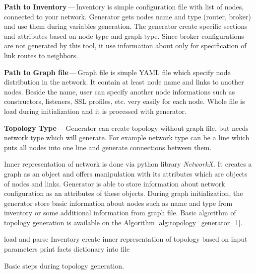 \begin{description}
	\item \textbf{Path to Inventory}\,---\,Inventory is simple configuration file with list of nodes, connected to your network. Generator gets nodes name and type (router, broker) and use them during variables generation. The generator create specific sections and attributes based on node type and graph type. Since broker configurations are not generated by this tool, it use information about only for specification of link routes to neighbors.
	\item \textbf{Path to Graph file}\,---\,Graph file is simple YAML file which specify node distribution in the network. It contain at least node name and links to another nodes. Beside the name, user can specify another node informations such as constructors, listeners, SSL profiles, etc. very easily for each node. Whole file is load during initialization and it is processed with generator.
	\item \textbf{Topology Type}\,---\,Generator can create topology without graph file, but needs network type which will generate. For example network type can be a line which puts all nodes into one line and generate connections between them.
\end{description}

Inner representation of network is done via python library \emph{NetworkX}\footnotemark. It creates a graph as an object and offers manipulation with its attributes which are objects of nodes and links. Generator is able to store information about network configuration as an attributes of these objects. During graph initialization, the generator store basic information about nodes such as name and type from inventory or some additional information from graph file. Basic algorithm of topology generation is available on the Algorithm \ref{alg:topology_generator_1}.

\begin{center}
	\begin{algorithm}[H]
		 load and parse Inventory\;
		 create inner representation of topology based on input parameters\;
		 print facts dictionary into file\;
		 \caption{Basic steps during topology generation.}
		 \label{alg:topology_generator_1}
	\end{algorithm}
\end{center}

